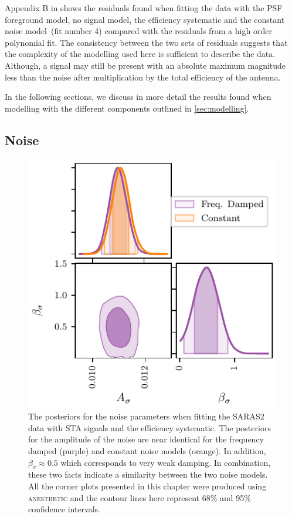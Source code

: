 Appendix B in \cite{Bevins_SARAS2_2022} shows the residuals found when fitting the data with the PSF foreground model, no signal model, the efficiency systematic and the constant noise model~(fit number 4) compared with the residuals from a high order polynomial fit. The consistency between the two sets of residuals suggests that the complexity of the modelling used here is sufficient to describe the data. Although, a signal may still be present with an absolute maximum magnitude less than the noise after multiplication by the total efficiency of the antenna.

In the following sections, we discuss in more detail the results found when modelling with the different components outlined in \cref{sec:modelling}.

\subsection{Noise}
\label{sec:noise_results}

\begin{figure}
    \centering
    \includegraphics{saras2/figs/noise_models_posteriors.pdf}
    \caption{The posteriors for the noise parameters when fitting the SARAS2 data with STA signals and the efficiency systematic. The posteriors for the amplitude of the noise are near identical for the frequency damped (purple) and constant noise models (orange). In addition, $\beta_\sigma \approx0.5$ which corresponds to very weak damping. In combination, these two facts indicate a similarity between the two noise models. All the corner plots presented in this chapter were produced using \textsc{anesthetic} \citep{anesthetic} and the contour lines here represent 68\% and 95\% confidence intervals.}
    \label{fig:noise_posterior_example}
\end{figure}

